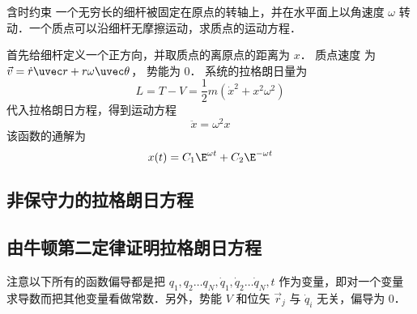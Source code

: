 \begin{exam}{含时约束}
一个无穷长的细杆被固定在原点的转轴上，并在水平面上以角速度 $\omega$ 转动．一个质点可以沿细杆无摩擦运动，求质点的运动方程．

首先给细杆定义一个正方向，并取质点的离原点的距离为 $x$． 质点速度%
为 $\vec v = \dot r \uvec r + r\omega \uvec\theta$， 势能为 0． 系统的拉格朗日量为
\begin{equation}
L = T - V = \frac12 m(\dot x^2 + x^2 \omega^2)
\end{equation}
代入拉格朗日方程，得到运动方程
\begin{equation}
\ddot x = \omega^2 x
\end{equation}
该函数的通解为%
\begin{equation}
x(t) = C_1 \E^{\omega t} + C_2 \E^{-\omega t}
\end{equation}
\end{exam}

\subsection{非保守力的拉格朗日方程}


\subsection{由牛顿第二定律证明拉格朗日方程}
注意以下所有的函数偏导都是把 $q_1, q_2\dots q_N, \dot q_1, \dot q_2\dots \dot q_N, t$ 作为变量，即对一个变量求导数而把其他变量看做常数．另外，势能 $V$ 和位矢 $\vec r_j$ 与 $\dot q_i$ 无关，偏导为 0．

